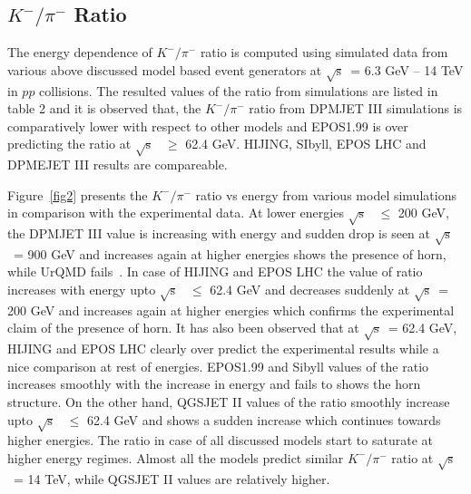 \documentclass{article}
\newcommand{\sqrts}{\mbox{$\sqrt{\mathrm{s}}$}}
\begin{document}


\subsection{$K^-/\pi^-$ Ratio}\label{subsec1}

The energy dependence of $K^-/\pi^-$ ratio is computed using simulated data from various  above discussed model based event generators at \sqrts~= 6.3 GeV -- 14 TeV in $pp$ collisions. The resulted values of the ratio from simulations are listed in table 2 and it is observed that, the $K^-/\pi^-$ ratio from DPMJET III simulations is comparatively lower with respect to other models and EPOS1.99 is over predicting the ratio at \sqrts~ $\ge$ 62.4 GeV. HIJING, SIbyll, EPOS LHC and DPMEJET III results are compareable.  


Figure~\ref{fig2} presents the $K^-/\pi^-$ ratio vs energy from various model simulations in comparison with the experimental data. At lower energies \sqrts~ $\le$ 200 GeV, the DPMJET III value is increasing with energy and sudden drop is seen at \sqrts~= 900 GeV and increases again at higher energies shows the presence of horn, while UrQMD fails~\cite{Bhattacharyya:2017rmc}. In case of HIJING and EPOS LHC the value of ratio increases with energy upto \sqrts~ $\le$ 62.4 GeV and decreases suddenly at \sqrts~= 200 GeV and increases again at higher energies which confirms the experimental claim of the presence of horn. It has also been observed that at \sqrts~= 62.4 GeV, HIJING and EPOS LHC clearly over predict the experimental results while a nice comparison at rest of energies. EPOS1.99 and Sibyll values of the ratio increases smoothly with the increase in energy and fails to shows the horn structure. On the other hand, QGSJET II values of the ratio smoothly increase upto \sqrts~ $\le$ 62.4 GeV and shows a sudden increase which continues towards higher energies. The ratio in case of all discussed models start to saturate at higher energy regimes. Almost all the models predict similar $K^-/\pi^-$ ratio at \sqrts~= 14 TeV, while QGSJET II values are relatively higher.    
\end{document}
